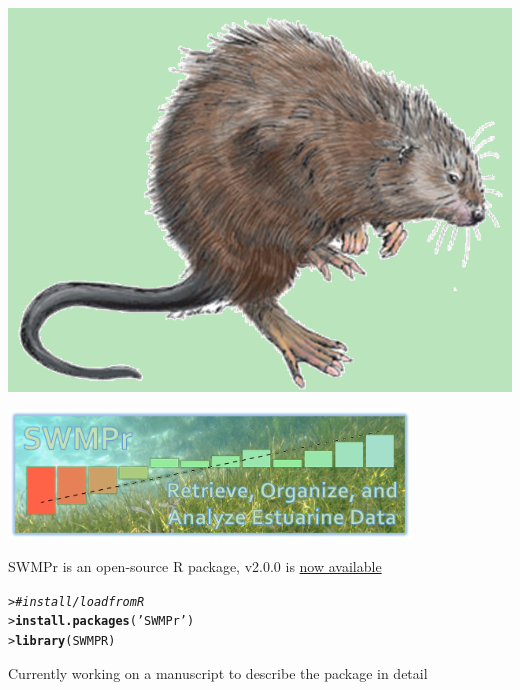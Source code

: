 \documentclass[serif]{beamer}\usepackage[]{graphicx}\usepackage[]{color}
\makeatletter
\newcommand{\hlstr}[1]{\textcolor[rgb]{0.192,0.494,0.8}{#1}}%
\newcommand{\hlcom}[1]{\textcolor[rgb]{0.678,0.584,0.686}{\textit{#1}}}%
\newcommand{\hlstd}[1]{\textcolor[rgb]{0.345,0.345,0.345}{#1}}%
\newcommand{\hlkwd}[1]{\textcolor[rgb]{0.737,0.353,0.396}{\textbf{#1}}}%
\newenvironment{kframe}{%
 \def\at@end@of@kframe{}%
 \ifinner\ifhmode%
  \def\at@end@of@kframe{\end{minipage}}%
  \begin{minipage}{\columnwidth}%
 \fi\fi%
 \def\FrameCommand##1{\hskip\@totalleftmargin \hskip-\fboxsep
 \colorbox{shadecolor}{##1}\hskip-\fboxsep
     \hskip-\linewidth \hskip-\@totalleftmargin \hskip\columnwidth}%
 \MakeFramed {\advance\hsize-\width
   \@totalleftmargin\z@ \linewidth\hsize
   \@setminipage}}%
 {\par\unskip\endMakeFramed%
 \at@end@of@kframe}
\newenvironment{knitrout}{}{} %
\makeatother
\begin{document}
\begin{frame}[fragile]{\includegraphics[width=0.05\paperwidth]{fig/muskrat.png}\hspace{0.07in}{\bf SWMPrats.net: The SWMPr package}}
\centerline{\includegraphics[width = 0.8\textwidth]{fig/swmpr_logo.png}}
\vspace{0.15in}
SWMPr is an open-source R package, v2.0.0 is \href{http://cran.r-project.org/web/packages/SWMPr/index.html}{now available}
\begin{knitrout}
\color{fgcolor}\begin{kframe}
\begin{alltt}
\hlstd{> }\hlcom{# install/load from R}
\hlstd{> }\hlkwd{install.packages}\hlstd{(}\hlstr{'SWMPr'}\hlstd{)}
\hlstd{> }\hlkwd{library}\hlstd{(SWMPR)}
\end{alltt}
\end{kframe}
\end{knitrout}
Currently working on a manuscript to describe the package in detail
\end{frame}
\end{document}

